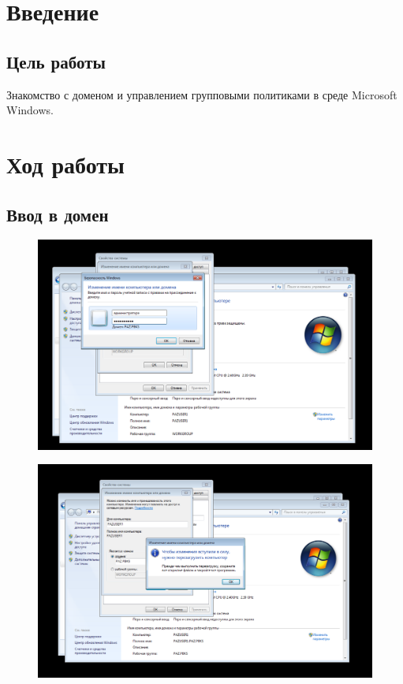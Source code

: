 \chapter{Введение}

\section{Цель работы}

Знакомство с доменом и управлением групповыми политиками в среде Microsoft Windows.

\chapter{Ход работы}

\section{Ввод в домен}

\begin{figure}[H]
	\centering
	\includegraphics[width=.8\textwidth]{images/1.png}
\end{figure}

\begin{figure}[H]
	\centering
	\includegraphics[width=.8\textwidth]{images/2.png}
\end{figure}

